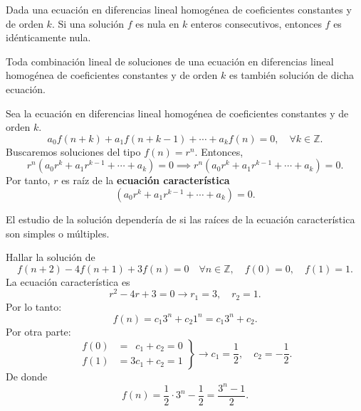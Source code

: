 \begin{theorem}{}
	Dada una ecuación en diferencias lineal homogénea de coeficientes constantes y de orden $k$. Si una solución $f$ es nula en $k$ enteros consecutivos, entonces $f$ es idénticamente nula.
\end{theorem}

\begin{theorem}{}
	Toda combinación lineal de soluciones de una ecuación en diferencias lineal homogénea de coeficientes constantes y de orden $k$ es también solución de dicha ecuación.
\end{theorem}

\begin{definition}
Sea la ecuación en diferencias lineal homogénea de coeficientes constantes y de orden $k$. \[ a_{0}f(n+k)+a_{1}f(n+k-1)+\cdots+a_{k}f(n)=0,\quad\forall k\in\mathds{Z}. \] Buscaremos soluciones del tipo $f(n)=r^{n}.$ Entonces, \[ r^{n}\left(a_{0}r^{k}+a_{1}r^{k-1}+\cdots+a_{k}\right)=0\implies r^{n}(a_{0}r^{k}+a_{1}r^{k-1}+\cdots+a_{k})=0. \] Por tanto, $r$ es raíz de la \textbf{ecuación característica} \[ (a_{0}r^{k}+a_{1}r^{k-1}+\cdots+a_{k})=0. \]
\end{definition}

El estudio de la solución dependería de si las raíces de la ecuación característica son simples o múltiples.
\begin{example}
	Hallar la solución de \[ f(n+2)-4f(n+1)+3f(n)=0\quad\forall n\in\mathds{Z},\quad f(0)=0,\quad f(1)=1. \] La ecuación característica es \[ r^{2}-4r+3=0\rightarrow r_{1}=3,\quad r_{2}=1. \] Por lo tanto: \[ f(n)=c_{1}3^{n}+c_{2}1^{n}=c_{1}3^{n}+c_{2}. \] Por otra parte:
	\begin{equation*}
	\left.\begin{aligned}
	f(0)&=\phantom{1}c_{1}+c_{2}=0\\
	f(1)&=3c_{1}+c_{2}=1
	\end{aligned}
	\right\}
	\longrightarrow c_{1}=\frac{1}{2},\quad c_{2}=-\frac{1}{2}.
	\end{equation*}
De donde \[ f(n)=\frac{1}{2}\cdot3^{n}-\frac{1}{2}=\frac{3^{n}-1}{2}. \]
\end{example}
